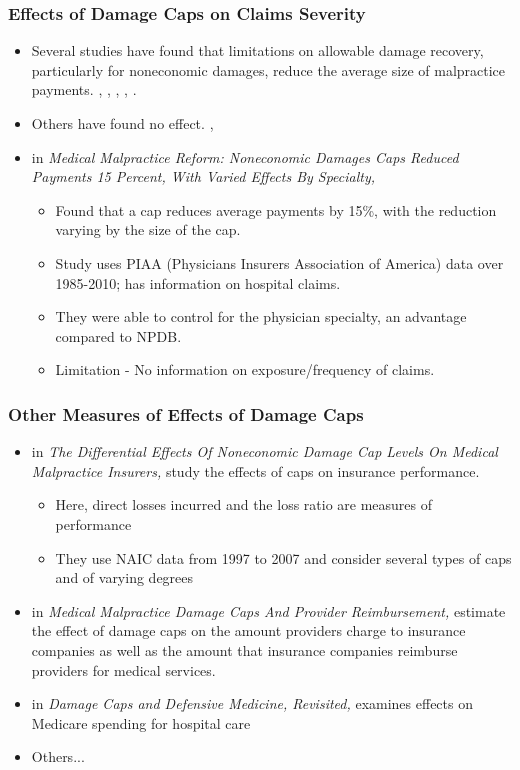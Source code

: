 \documentclass[serif,10pt]{beamer}
\begin{document}
\begin{frame}
\frametitle{Effects of Damage Caps on Claims Severity}
 \begin{itemize}
\item Several studies have found that limitations on allowable damage recovery, particularly for noneconomic damages, reduce the average size of malpractice payments. \cite{avraham2007empirical}, \cite{danzon1984frequency}, \cite{danzon1986frequency}, \cite{sloan1985state}, \cite{yoon2001damage}.
\item Others have found no effect. \cite{zuckerman1990effects}, \cite{durrance2009noneconomic}
\item \cite{seabury2014medical} in {\small \textit{Medical Malpractice Reform: Noneconomic Damages Caps Reduced Payments 15 Percent, With Varied Effects By Specialty,}}
\begin{itemize}
\item Found that a cap reduces average payments by 15\%, with the reduction varying by the size of the cap.
\item Study uses PIAA (Physicians Insurers Association of America) data over 1985-2010; has information on hospital claims.
\item They were able to control for the physician specialty, an advantage compared to NPDB.
\item Limitation - No information on exposure/frequency of claims.
\end{itemize}
\end{itemize}
\end{frame}

\begin{frame}
\frametitle{Other Measures of Effects of Damage Caps}
 \begin{itemize}
\item \cite{born2014differential} in {\small \textit{The Differential Effects Of Noneconomic Damage Cap Levels On Medical Malpractice Insurers,}} study the effects of caps on insurance performance.
 \begin{itemize}
 \item Here, direct losses incurred and the loss ratio are measures of performance
 \item They use NAIC data from 1997 to 2007 and consider several types of caps and of varying degrees
 \end{itemize}
 \item \cite{friedson2017medical} in {\small \textit{Medical Malpractice Damage Caps And Provider Reimbursement,}} estimate the effect of damage caps on the amount providers charge to insurance companies as
well as the amount that insurance companies reimburse providers for medical services.
 \item \cite{paik2017damage} in {\small \textit{Damage Caps and Defensive Medicine, Revisited,}} examines effects on Medicare spending for hospital care
 \item Others...
\end{itemize}

\end{frame}
\end{document}
